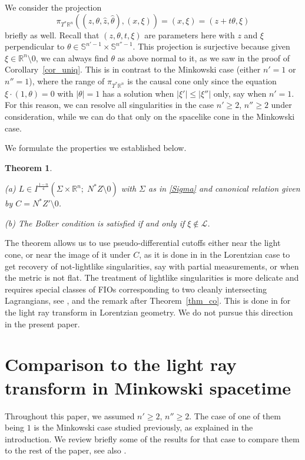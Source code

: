 \documentclass[11pt]{amsart}
\newtheorem{theorem}{Theorem}[section]
\theoremstyle{definition}
\theoremstyle{remark}
\numberwithin{equation}{section}
\newcommand{\be}[1]{\begin{equation}\label{#1}}
\newcommand{\ee}{\end{equation}}
\newcommand{\rb}{\mathbb{R}}
\renewcommand{\sb}{\mathbb{S}}
\begin{document}
We consider the projection
    \be{MA_light_7}
\pi_{T^*\rb^n} ((z,\theta,{\hat z},\hat\theta) , (x, \xi )) =     (x, \xi )  = (z+t\theta, \xi) 
    \ee
briefly as well. Recall that $(z,\theta,t,\xi)$ are parameters here with $z$ and $\xi$ perpendicular to $\theta\in \sb^{n'-1}\times \sb^{n''-1}$. This projection is surjective because given $\xi\in \rb^n\setminus 0$, we can always find $\theta$ as above normal to it, as we saw in the proof of Corollary~\ref{cor_uniq}. This is in contrast to the Minkowski case (either $n'=1$ or $n''=1$), where the range of $\pi_{T^*\rb^n}$ is the causal cone only since the equation $\xi\cdot(1,\theta)=0$ with $|\theta|=1$ has a solution when $|\xi'|\le |\xi''|$ only, say when $n'=1$. For this reason, we can resolve all singularities in the case $n'\ge2$, $n''\ge2$ under consideration, while we can do that only on the spacelike cone in the Minkowski case. 

We formulate the properties we established below.

\begin{theorem}\label{thm_FIO} \ 

(a) $L\in I^\frac{1-n}4(\Sigma\times\rb^n; \; N^*Z\setminus 0)$ with $\Sigma$ as in \eqref{Sigma} and canonical relation given by $C = N^*Z'\setminus 0$. 

(b) The Bolker condition is satisfied if and only if $\xi\not\in\mathcal L$.   
\end{theorem}

The theorem allows us to use pseudo-differential cutoffs either near the light cone, or near the image of it under $C$, as it is done in \cite{LOSU-Light_Ray, LOSU-strings} in the Lorentzian case to get recovery of not-lightlike singularities, say with partial measurements, or when the metric is not flat. The treatment of lightlike singularities is more delicate and requires special classes of FIOs corresponding to two cleanly intersecting Lagrangians, see \cite{Greenleaf_Uhlmann90, Greenleaf_UhlmannCM, Greenleaf-Uhlmann}, and the remark after Theorem~\ref{thm_co}. This is done in \cite{Yiran-Light-2021} for the light ray transform in Lorentzian geometry.  We do not pursue this direction in the present paper. 

\section{Comparison to the light ray transform in Minkowski spacetime}\label{minkowski}

Throughout this paper, we assumed $n'\ge2$, $n''\ge2$. The case of one of them being $1$ is the Minkowski case studied previously, as explained in the introduction. We review briefly some of the results for that case to compare them to the rest of the paper, see also \cite{S-Lorentz_analytic, LOSU-Light_Ray, SU-book}.
\end{document}
